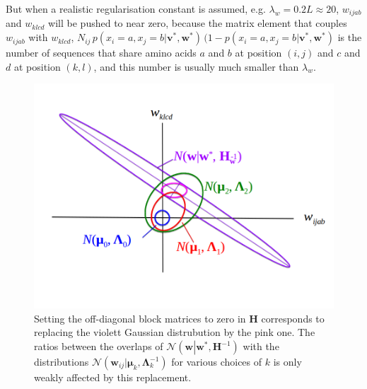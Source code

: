 \documentclass[11pt,a4paper,twoside]{book}
\newcommand{\eq}{\!=\!}
\newcommand{\Gauss}{\mathcal{N}}
\renewcommand{\H}{\mathbf{H}}
\newcommand{\Lk}{\mathbf{\Lambda}_k}
\newcommand{\muk}{\mathbf{\mu}_k}
\renewcommand{\v}{\mathbf{v}}
\newcommand{\w}{\mathbf{w}}
\newcommand{\wij}{\mathbf{w}_{ij}}
\theoremstyle{definition}
\theoremstyle{definition}
\theoremstyle{remark}
\begin{document}
But when a realistic regularisation constant is assumed, e.g.
\(\lambda_w \eq 0.2 L \approx 20\), \(w_{ijab}\) and \(w_{klcd}\) will
be pushed to near zero, because the matrix element that couples
\(w_{ijab}\) with \(w_{klcd}\),
\(N_{ij}\,p(x_i \eq a, x_j \eq b| \v^*,\w^*) \, ( 1 - p(x_i \eq a, x_j \eq b| \v^*,\w^*)\)
is the number of sequences that share amino acids \(a\) and \(b\) at
position \((i,j)\) and \(c\) and \(d\) at position \((k,l)\), and this
number is usually much smaller than \(\lambda_w\).








\begin{figure}

{\centering \includegraphics[width=0.8\linewidth]{img/theory/hessian-off-diagonal} 

}

\caption{Setting the off-diagonal block
matrices to zero in \(\H\) corresponds to replacing the violett Gaussian
distrubution by the pink one. The ratios between the overlaps of
\(\Gauss\!\left(\w \left| \w^*, \H^{-1} \right. \right)\) with the
distributions \(\Gauss(\wij | \muk, \Lk^{-1})\) for various choices of
\(k\) is only weakly affected by this replacement.}\label{fig:hessian-off-diagonal}
\end{figure}
\end{document}
